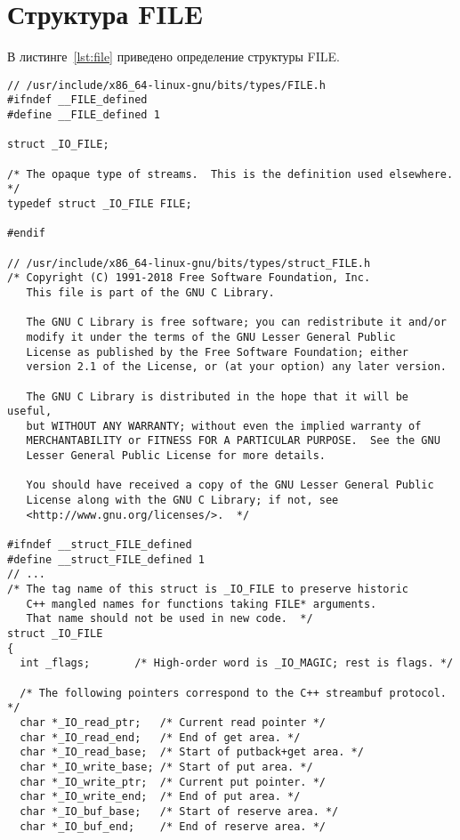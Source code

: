 \chapter{Структура FILE}

В листинге~\ref{lst:file} приведено определение структуры FILE.

\begin{lstlisting}[caption={Структура FILE},label=lst:file]
// /usr/include/x86_64-linux-gnu/bits/types/FILE.h
#ifndef __FILE_defined
#define __FILE_defined 1

struct _IO_FILE;

/* The opaque type of streams.  This is the definition used elsewhere.  */
typedef struct _IO_FILE FILE;

#endif

// /usr/include/x86_64-linux-gnu/bits/types/struct_FILE.h
/* Copyright (C) 1991-2018 Free Software Foundation, Inc.
   This file is part of the GNU C Library.

   The GNU C Library is free software; you can redistribute it and/or
   modify it under the terms of the GNU Lesser General Public
   License as published by the Free Software Foundation; either
   version 2.1 of the License, or (at your option) any later version.

   The GNU C Library is distributed in the hope that it will be useful,
   but WITHOUT ANY WARRANTY; without even the implied warranty of
   MERCHANTABILITY or FITNESS FOR A PARTICULAR PURPOSE.  See the GNU
   Lesser General Public License for more details.

   You should have received a copy of the GNU Lesser General Public
   License along with the GNU C Library; if not, see
   <http://www.gnu.org/licenses/>.  */

#ifndef __struct_FILE_defined
#define __struct_FILE_defined 1
// ...
/* The tag name of this struct is _IO_FILE to preserve historic
   C++ mangled names for functions taking FILE* arguments.
   That name should not be used in new code.  */
struct _IO_FILE
{
  int _flags;		/* High-order word is _IO_MAGIC; rest is flags. */

  /* The following pointers correspond to the C++ streambuf protocol. */
  char *_IO_read_ptr;	/* Current read pointer */
  char *_IO_read_end;	/* End of get area. */
  char *_IO_read_base;	/* Start of putback+get area. */
  char *_IO_write_base;	/* Start of put area. */
  char *_IO_write_ptr;	/* Current put pointer. */
  char *_IO_write_end;	/* End of put area. */
  char *_IO_buf_base;	/* Start of reserve area. */
  char *_IO_buf_end;	/* End of reserve area. */


\end{lstlisting}
